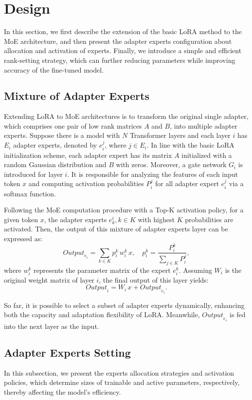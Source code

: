 \section{\name Design}\label{sec:methodology}
In this section, we first describe the extension of the basic LoRA method to the MoE architecture, and then present the adapter experts configuration about allocation and activation of experts. Finally, we introduce a simple and efficient rank-setting strategy, which can further reducing parameters while improving accuracy of the fine-tuned model.

\subsection{Mixture of Adapter Experts}
Extending LoRA to MoE architectures is to transform the original single adapter, which comprises one pair of low rank matrices \(A\) and \(B\), into multiple adapter experts. 
Suppose there is a model with \(N\) Transformer layers and each layer \(i\) has \(E_i\) adapter experts, denoted by \(e^j_i\), where \(j \in E_i\). 
In line with the basic LoRA initialization scheme, each adapter expert has its matrix \(A\) initialized with a random Gaussian distribution and \(B\) with zeros.
Moreover, a gate network \(G_i\) is introduced for layer \(i\). It is responsible for analyzing the features of each input token \(x\) and computing activation probabilities \(P^j_i\) for all adapter expert \(e^j_i\) via a softmax function. 

Following the MoE computation procedure with a Top-K activation policy, for a given token \(x\), the adapter experts \(e^i_k, k\in K\) with highest \(K\) probabilities are activated. Then, the output of this mixture of adapter experts layer can be expressed as:
\[
{Output}_{e_i} 
= \sum_{k \in K} p^k_i \, w^k_i \, {x},
\quad
p^k_i 
= \frac{P^k_i}{\sum_{j \in K} P^j_i},
\]
where \(w^k_i\) represents the parameter matrix of the expert \(e^k_i\). 
Assuming \(W_i\) is the original weight matrix of layer \(i\), the final output of this layer yields:
\[{Output}_i = W_i \, {x} + {Output}_{e_i}.\] 

So far, it is possible to select a subset of adapter experts dynamically, enhancing both the capacity and adaptation flexibility of LoRA. Meanwhile, \({Output}_{e_i}\) is fed into the next layer as the input.

\subsection{Adapter Experts Setting}
In this subsection, we present the experts allocation strategies and activation policies, which determine sizes of trainable and active parameters, respectively, thereby affecting the model’s efficiency.

